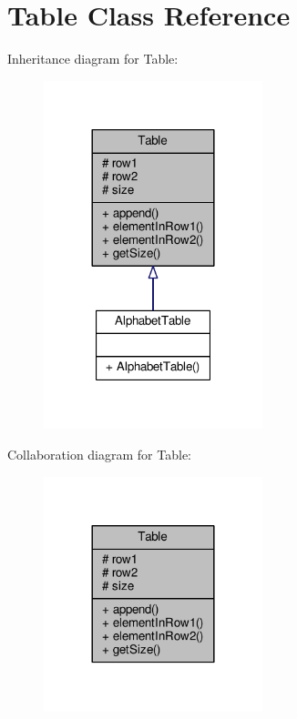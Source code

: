 \hypertarget{classTable}{}\section{Table Class Reference}
\label{classTable}


Inheritance diagram for Table\+:
\nopagebreak
\begin{figure}[H]
\begin{center}
\leavevmode
\includegraphics[width=180pt]{classTable__inherit__graph}
\end{center}
\end{figure}


Collaboration diagram for Table\+:
\nopagebreak
\begin{figure}[H]
\begin{center}
\leavevmode
\includegraphics[width=180pt]{classTable__coll__graph}
\end{center}
\end{figure}
